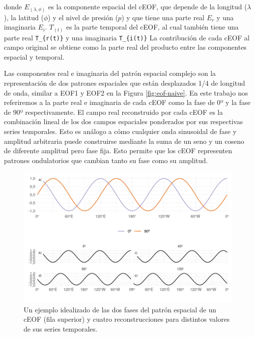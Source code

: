 \documentclass[12pt,oneside,a4paper]{reedthesis}
\begin{document}
donde \(E_{(\lambda, \phi)}\) es la componente espacial del cEOF, que depende de la longitud (\(\lambda\)), la latitud (\(\phi\)) y el nivel de presión (\(p\)) y que tiene una parte real \(E_r\) y una imaginaria \(E_i\).
\(T_{(t)}\) es la parte temporal del cEOF, al cual también tiene una parte real \texttt{T\_\{r(t)\}} y una imaginaria \texttt{T\_\{i(t)\}}
La contribución de cada cEOF al campo original se obtiene como la parte real del producto entre las componentes espacial y temporal.

Las componentes real e imaginaria del patrón espacial complejo son la representación de dos patrones espaciales que están desplazados 1/4 de longitud de onda, similar a EOF1 y EOF2 en la Figura \ref{fig:eof-naive}.
En este trabajo nos referiremos a la parte real e imaginaria de cada cEOF como la fase de 0º y la fase de 90º respectivamente.
El campo real reconstruido por cada cEOF es la combinación lineal de los dos campos espaciales ponderados por sus respectivas series temporales.
Esto es análogo a cómo cualquier onda sinusoidal de fase y amplitud arbitraria puede construirse mediante la suma de un seno y un coseno de diferente amplitud pero fase fija.
Esto permite que los cEOF representen patrones ondulatorios que cambian tanto su fase como su amplitud.

\begin{figure}

{\centering \includegraphics{figures/20-ceofs/ejemplo-reconstruccion-1} 

}

\caption{Un ejemplo idealizado de las dos fases del patrón espacial de un cEOF (fila superior) y cuatro reconstrucciones para distintos valores de sus series temporales.}\label{fig:ejemplo-reconstruccion}
\end{figure}
\end{document}
